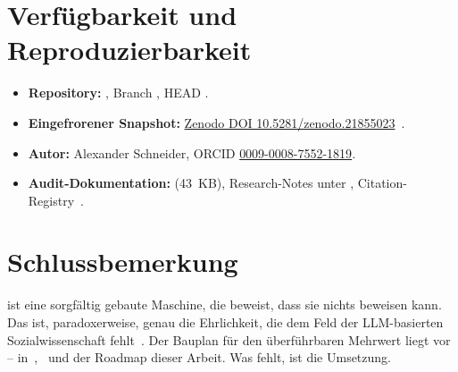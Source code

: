 \section{Verf{\"u}gbarkeit und Reproduzierbarkeit}\label{sec:verfuegbarkeit}

\begin{itemize}
  \item \textbf{Repository:} \href{https://github.com/arn0ld87/agora}{}, Branch , HEAD .
  \item \textbf{Eingefrorener Snapshot:} \href{https://zenodo.org/records/21855023}{Zenodo DOI 10.5281/zenodo.21855023}~\cite{zenodo-agora}.
  \item \textbf{Autor:} Alexander Schneider, ORCID \href{https://orcid.org/0009-0008-7552-1819}{0009-0008-7552-1819}.
  \item \textbf{Audit-Dokumentation:}  (43~KB), Research-Notes unter , Citation-Registry~\cite{citation-registry}.
\end{itemize}

\section{Schlussbemerkung}\label{sec:schlussbemerkung}

\agora{} ist eine sorgf{\"a}ltig gebaute Maschine, die beweist, dass sie nichts beweisen kann. Das ist, paradoxerweise, genau die Ehrlichkeit, die dem Feld der LLM-basierten Sozialwissenschaft fehlt~\cite{bail2024genai,analyticflexibility}. Der Bauplan f{\"u}r den {\"u}berf{\"u}hrbaren Mehrwert liegt vor -- in~\cite{adr-0011},~\cite{adr-0013} und der Roadmap dieser Arbeit. Was fehlt, ist die Umsetzung.